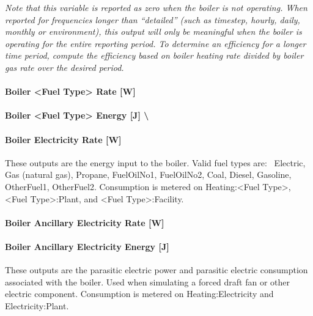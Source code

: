 \emph{Note that this variable is reported as zero when the boiler is not operating. When reported for frequencies longer than ``detailed'' (such as timestep, hourly, daily, monthly or environment), this output will only be meaningful when the boiler is operating for the entire reporting period. To determine an efficiency for a longer time period, compute the efficiency based on boiler heating rate divided by boiler gas rate over the desired period.}

\paragraph{Boiler \textless{}Fuel Type\textgreater{} Rate {[}W{]}}\label{boiler-fuel-type-rate-w}

\paragraph{Boiler \textless{}Fuel Type\textgreater{} Energy {[}J{]} \textbackslash{}}\label{boiler-fuel-type-energy-j}

\paragraph{Boiler Electricity Rate {[}W{]}}\label{boiler-electric-power-w}

These outputs are the energy input to the boiler. Valid fuel types are:~ Electric, Gas (natural gas), Propane, FuelOilNo1, FuelOilNo2, Coal, Diesel, Gasoline, OtherFuel1, OtherFuel2. Consumption is metered on Heating:\textless{}Fuel Type\textgreater{}, \textless{}Fuel Type\textgreater{}:Plant, and \textless{}Fuel Type\textgreater{}:Facility.

\paragraph{Boiler Ancillary Electricity Rate {[}W{]}}\label{boiler-ancillary-electric-power-w}

\paragraph{Boiler Ancillary Electricity Energy {[}J{]}}\label{boiler-ancillary-electric-energy-j}

These outputs are the parasitic electric power and parasitic electric consumption associated with the boiler. Used when simulating a forced draft fan or other electric component. Consumption is metered on Heating:Electricity and Electricity:Plant.

